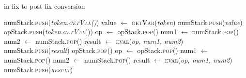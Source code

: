 \documentclass{article}
\begin{document}
        
        \begin{algorithm}
                \caption{in-fix to post-fix conversion}
                \label{shuntingYard}
                \begin{algorithmic}[1]
                                        \State numStack.\textsc{push}(\textit{token.\textsc{getVal()}})
                                        \State value $ \gets $ \textsc{getVar}(\textit{token})
                                        \State numStack.\textsc{push}(\textit{value})
                                        \State opStack.\textsc{push}(\textit{token.\textsc{getVal}}())
                                                \State op $ \gets $ opStack.\textsc{pop}()
                                                \State num1 $ \gets $ numStack.\textsc{pop}()
                                                \State num2 $ \gets $ numStack.\textsc{pop}()
                                                \State result $ \gets $ \textsc{eval}(\textit{op, num1, num2})
                                                \State numStack.\textsc{push}(\textit{result})
                                        \EndWhile
                                        \State opStack.\textsc{pop}()
                                                \State op $ \gets $ opStack.\textsc{pop}()
                                                \State num1 $ \gets $ numStack.\textsc{pop}()
                                                \State num2 $ \gets $ numStack.\textsc{pop}()
                                                \State result $ \gets $ \textsc{eval}(\textit{op, num1, num2})
                                                \State numStack.\textsc{push(\textit{result})}
                                        \EndWhile

\end{algorithmic}
\end{algorithm}
\end{document}
